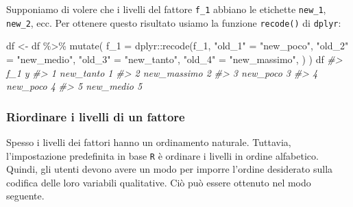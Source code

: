\documentclass[
]{memoir}
\newenvironment{Shaded}{\begin{snugshade}}{\end{snugshade}}
\newcommand{\AttributeTok}[1]{\textcolor[rgb]{0.77,0.63,0.00}{#1}}
\newcommand{\CommentTok}[1]{\textcolor[rgb]{0.56,0.35,0.01}{\textit{#1}}}
\newcommand{\FunctionTok}[1]{\textcolor[rgb]{0.00,0.00,0.00}{#1}}
\newcommand{\NormalTok}[1]{#1}
\newcommand{\OtherTok}[1]{\textcolor[rgb]{0.56,0.35,0.01}{#1}}
\newcommand{\SpecialCharTok}[1]{\textcolor[rgb]{0.00,0.00,0.00}{#1}}
\newcommand{\StringTok}[1]{\textcolor[rgb]{0.31,0.60,0.02}{#1}}
\theoremstyle{definition}
\theoremstyle{definition}
\theoremstyle{definition}
\theoremstyle{definition}
\theoremstyle{remark}
\begin{document}
Supponiamo di volere che i livelli del fattore \texttt{f\_1} abbiano le etichette \texttt{new\_1}, \texttt{new\_2}, ecc. Per ottenere questo risultato usiamo la funzione \texttt{recode()} di \texttt{dplyr}:

\begin{Shaded}
\begin{Highlighting}[]
\NormalTok{df }\OtherTok{\textless{}{-}}\NormalTok{ df }\SpecialCharTok{\%\textgreater{}\%}
  \FunctionTok{mutate}\NormalTok{(}
    \AttributeTok{f\_1 =}
\NormalTok{      dplyr}\SpecialCharTok{::}\FunctionTok{recode}\NormalTok{(f\_1,}
        \StringTok{"old\_1"} \OtherTok{=} \StringTok{"new\_poco"}\NormalTok{,}
        \StringTok{"old\_2"} \OtherTok{=} \StringTok{"new\_medio"}\NormalTok{,}
        \StringTok{"old\_3"} \OtherTok{=} \StringTok{"new\_tanto"}\NormalTok{,}
        \StringTok{"old\_4"} \OtherTok{=} \StringTok{"new\_massimo"}\NormalTok{,}
\NormalTok{      )}
\NormalTok{  )}
\NormalTok{df}
\CommentTok{\#\textgreater{}           f\_1 y}
\CommentTok{\#\textgreater{} 1   new\_tanto 1}
\CommentTok{\#\textgreater{} 2 new\_massimo 2}
\CommentTok{\#\textgreater{} 3    new\_poco 3}
\CommentTok{\#\textgreater{} 4    new\_poco 4}
\CommentTok{\#\textgreater{} 5   new\_medio 5}
\end{Highlighting}
\end{Shaded}

\hypertarget{riordinare-i-livelli-di-un-fattore}{%
\subsubsection{Riordinare i livelli di un fattore}\label{riordinare-i-livelli-di-un-fattore}}

Spesso i livelli dei fattori hanno un ordinamento naturale. Tuttavia, l'impostazione predefinita in base \texttt{R} è ordinare i livelli in ordine alfabetico. Quindi, gli utenti devono avere un modo per imporre l'ordine desiderato sulla codifica delle loro variabili qualitative. Ciò può essere ottenuto nel modo seguente.

\begin{Shaded}
\end{Shaded}
\end{document}
